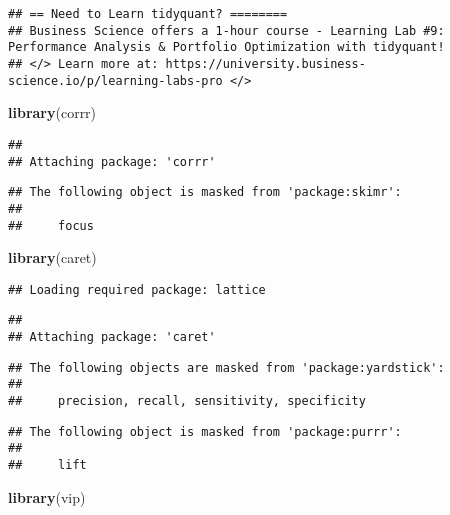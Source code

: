 \documentclass[
]{article}
\newenvironment{Shaded}{\begin{snugshade}}{\end{snugshade}}
\newcommand{\KeywordTok}[1]{\textcolor[rgb]{0.13,0.29,0.53}{\textbf{#1}}}
\newcommand{\NormalTok}[1]{#1}
\begin{document}
\begin{verbatim}
## == Need to Learn tidyquant? ========
## Business Science offers a 1-hour course - Learning Lab #9: Performance Analysis & Portfolio Optimization with tidyquant!
## </> Learn more at: https://university.business-science.io/p/learning-labs-pro </>
\end{verbatim}

\begin{Shaded}
\begin{Highlighting}[]
\KeywordTok{library}\NormalTok{(corrr)}
\end{Highlighting}
\end{Shaded}

\begin{verbatim}
## 
## Attaching package: 'corrr'
\end{verbatim}

\begin{verbatim}
## The following object is masked from 'package:skimr':
## 
##     focus
\end{verbatim}

\begin{Shaded}
\begin{Highlighting}[]
\KeywordTok{library}\NormalTok{(caret)}
\end{Highlighting}
\end{Shaded}

\begin{verbatim}
## Loading required package: lattice
\end{verbatim}

\begin{verbatim}
## 
## Attaching package: 'caret'
\end{verbatim}

\begin{verbatim}
## The following objects are masked from 'package:yardstick':
## 
##     precision, recall, sensitivity, specificity
\end{verbatim}

\begin{verbatim}
## The following object is masked from 'package:purrr':
## 
##     lift
\end{verbatim}

\begin{Shaded}
\begin{Highlighting}[]
\KeywordTok{library}\NormalTok{(vip)}
\end{Highlighting}
\end{Shaded}
\end{document}

